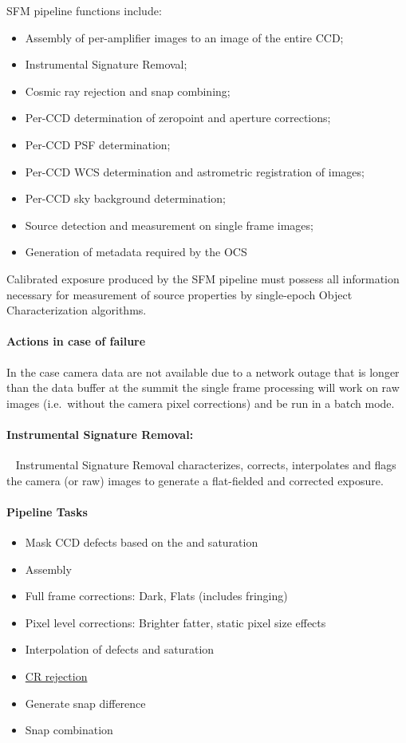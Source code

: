 SFM pipeline functions include:
\begin{itemize}
\item Assembly of per-amplifier images to an image of the entire CCD;
\item Instrumental Signature Removal;
\item Cosmic ray rejection and snap combining;
\item Per-CCD determination of zeropoint and aperture corrections;
\item Per-CCD PSF determination;
\item Per-CCD WCS determination and astrometric registration of images;
\item Per-CCD sky background determination;
\item Source detection and measurement on single frame images;
\item Generation of metadata required by the OCS
\end{itemize}

Calibrated exposure produced by the SFM pipeline must possess all information necessary for measurement of source properties by single-epoch Object Characterization algorithms.

\paragraph{Actions in case of failure}

In the case camera data are not available due to a network outage that is longer than the data buffer at the summit the single frame processing will work on raw images (i.e.\ without the camera pixel corrections) and be run in a batch mode. 



\paragraph{Instrumental Signature Removal:}~
\label{sec:apISR}
Instrumental Signature Removal characterizes, corrects, interpolates
and flags the camera (or raw) images to generate a flat-fielded and corrected
exposure.

\paragraph{Pipeline Tasks}
\begin{itemize}
\item Mask CCD defects based on the and saturation
\item Assembly
\item Full frame corrections: Dark, Flats (includes fringing)
\item Pixel level corrections: Brighter fatter, static pixel size effects
\item Interpolation of defects and saturation
\item \hyperref[sec:artifact]{CR rejection}
\item Generate snap difference
\item Snap combination
\end{itemize}


